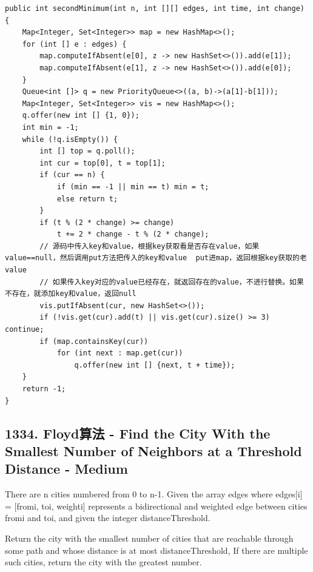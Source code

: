 \documentclass[9pt, b5paaper]{book}
\begin{document}
\begin{verbatim}
public int secondMinimum(int n, int [][] edges, int time, int change) {
    Map<Integer, Set<Integer>> map = new HashMap<>();
    for (int [] e : edges) {
        map.computeIfAbsent(e[0], z -> new HashSet<>()).add(e[1]);
        map.computeIfAbsent(e[1], z -> new HashSet<>()).add(e[0]);
    }
    Queue<int []> q = new PriorityQueue<>((a, b)->(a[1]-b[1]));
    Map<Integer, Set<Integer>> vis = new HashMap<>();
    q.offer(new int [] {1, 0});
    int min = -1;
    while (!q.isEmpty()) {
        int [] top = q.poll();
        int cur = top[0], t = top[1];
        if (cur == n) {
            if (min == -1 || min == t) min = t;
            else return t;
        }
        if (t % (2 * change) >= change)
            t += 2 * change - t % (2 * change);
        // 源码中传入key和value，根据key获取看是否存在value，如果value==null，然后调用put方法把传入的key和value  put进map，返回根据key获取的老value
        // 如果传入key对应的value已经存在，就返回存在的value，不进行替换。如果不存在，就添加key和value，返回null
        vis.putIfAbsent(cur, new HashSet<>());
        if (!vis.get(cur).add(t) || vis.get(cur).size() >= 3) continue;
        if (map.containsKey(cur))
            for (int next : map.get(cur)) 
                q.offer(new int [] {next, t + time});
    }
    return -1;
}
\end{verbatim}

\subsection{1334. Floyd算法 - Find the City With the Smallest Number of Neighbors at a Threshold Distance - Medium}
\label{sec-1-1-4}
There are n cities numbered from 0 to n-1. Given the array edges where edges[i] = [fromi, toi, weighti] represents a bidirectional and weighted edge between cities fromi and toi, and given the integer distanceThreshold.

Return the city with the smallest number of cities that are reachable through some path and whose distance is at most distanceThreshold, If there are multiple such cities, return the city with the greatest number.
\end{document}
